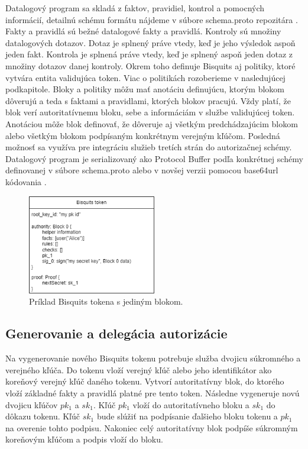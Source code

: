 Datalogový program sa skladá z faktov, pravidiel, kontrol a pomocných informácií, detailnú schému formátu nájdeme v súbore schema.proto repozitára \cite{biscuits_git}. Fakty a pravidlá sú bežné datalogové fakty a pravidlá. Kontroly sú množiny datalogových dotazov. Dotaz je splnený práve vtedy, keď je jeho výsledok aspoň jeden fakt. Kontrola je splnená práve vtedy, keď je splnený aspoň jeden dotaz z množiny dotazov danej kontroly. Okrem toho definuje Bisquits aj politiky, ktoré vytvára entita validujúca token. Viac o politikách rozoberieme v nasledujúcej podkapitole. Bloky a politiky môžu mať anotáciu definujúcu, ktorým blokom dôverujú a teda s faktami a pravidlami, ktorých blokov pracujú. Vždy platí, že blok verí autoritatívnemu bloku, sebe a informáciám v službe validujúcej token. Anotáciou môže blok definovať, že dôveruje aj všetkým predchádzajúcim blokom alebo všetkým blokom podpísaným konkrétnym verejným kľúčom. Posledná možnosť sa využíva pre integráciu služieb tretích strán do autorizačnej schémy.
Datalogový program je serializovaný ako Protocol Buffer \cite{protobuf} podľa konkrétnej schémy definovanej v súbore schema.proto alebo v novšej verzii pomocou base64url kódovania \cite{base64_rfc}.

\begin{figure}
    \centerline{\includegraphics[width=0.5\textwidth]{images/bisquits_token2}}
    \caption[Bisquits token]{Príklad Bisquits tokena s jediným blokom.}
    \label{fig:bisquits_token}
\end{figure}

\subsection{Generovanie a delegácia autorizácie}

Na vygenerovanie nového Bisquits tokenu potrebuje služba dvojicu súkromného a verejného kľúča. Do tokenu vloží verejný kľúč alebo jeho identifikátor ako koreňový verejný kľúč daného tokenu. Vytvorí autoritatívny blok, do ktorého vloží základné fakty a pravidlá platné pre tento token. Následne vygeneruje novú dvojicu kľúčov $pk_1$ a $sk_1$. Kľúč $pk_1$ vloží do autoritatívneho bloku a $sk_1$ do dôkazu tokenu. Kľúč $sk_1$ bude slúžiť na podpísanie ďalšieho bloku tokenu a $pk_1$ na overenie tohto podpisu. Nakoniec celý autoritatívny blok podpíše súkromným koreňovým kľúčom a podpis vloží do bloku.

